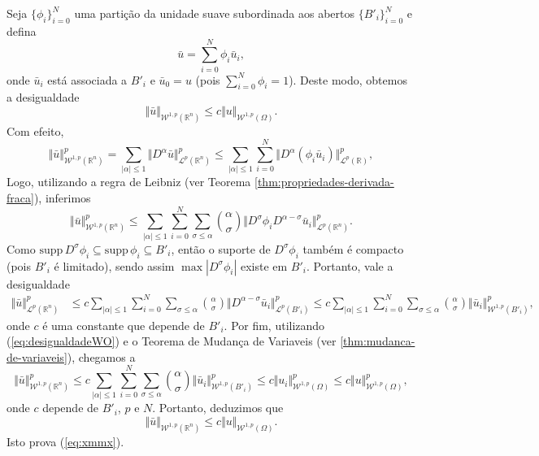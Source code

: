 \documentclass[a4paper, 11pt]{book}
\theoremstyle{definition}
\newcommand{\bR}{\mathbb{R}}
\newcommand{\cL}{\mathcal{L}}
\newcommand{\cW}{\mathcal{W}}
\newcommand{\supp}{\mathrm{supp}\,}
\begin{document}
\begin{prf}
    Seja $\{\phi_i\}_{i=0}^N$ uma partição da unidade suave subordinada aos abertos $\{B'_i\}_{i=0}^N$ e defina
    \begin{equation}
        \bar u = \sum_{i=0}^N \phi_i \bar u_i,
    \end{equation}
    onde $\bar u_i$ está associada a $B'_i$ e $\bar u_0 = u$ (pois $\sum_{i=0}^N \phi_i = 1$). Deste modo, obtemos a desigualdade
    \begin{equation} \label{eq:xmmx}
        \Vert \bar u \Vert_{\cW^{1,p}(\bR^n)} \leqslant c \Vert u \Vert_{\cW^{1,p}(\Omega)}.
    \end{equation}
    Com efeito,
    \[
        \Vert \bar u \Vert^p_{\cW^{1,p}(\bR^n)} = \sum_{|\alpha| \leqslant 1} \Vert D^\alpha \bar u \Vert^p_{\cL^p(\bR^n)}
        \leqslant \sum_{|\alpha| \leqslant 1} \sum_{i=0}^N \Vert D^\alpha (\phi_i \bar u_i) \Vert_{\cL^p(\bR)}^p,
    \]
    Logo, utilizando a regra de Leibniz (ver Teorema \ref{thm:propriedades-derivada-fraca}), inferimos
    \[
        \Vert \bar u \Vert_{\cW^{1,p}(\bR^n)}^p \leqslant \sum_{|\alpha| \leqslant 1} \sum_{i=0}^{N} \sum_{\sigma \leqslant \alpha} \binom{\alpha}{\sigma} \Vert D^\sigma \phi_i D^{\alpha - \sigma} \bar u_i \Vert_{\cL^p(\bR^n)}^p.
    \]
    Como $\supp D^\sigma \phi_i \subseteq \supp \phi_i \subseteq B'_i$, então o suporte de $D^\sigma \phi_i$ também é compacto (pois $B'_i$ é limitado), sendo assim $\max |D^\sigma \phi_i|$ existe em $B'_i$.
    Portanto, vale a desigualdade
    \[
        \begin{aligned}
            \Vert \bar u \Vert_{\cL^p(\bR^n)}^p &\leqslant c\sum_{|\alpha| \leqslant 1} \sum_{i=0}^{N} \sum_{\sigma \leqslant \alpha} \binom{\alpha}{\sigma} \Vert D^{\alpha - \sigma} \bar u_i \Vert_{\cL^p(B'_i)}^p \leqslant c\sum_{|\alpha| \leqslant 1} \sum_{i=0}^{N} \sum_{\sigma \leqslant \alpha} \binom{\alpha}{\sigma} \Vert \bar u_i \Vert_{\cW^{1,p}(B'_i)}^p,
        \end{aligned}
    \]
    onde $c$ é uma constante que depende de $B'_i$.
    Por fim, utilizando (\ref{eq:desigualdadeWO}) e o Teorema de Mudança de Variaveis (ver \ref{thm:mudanca-de-variaveis}), chegamos a
    \[
         \Vert \bar u \Vert^p_{\cW^{1,p}(\bR^n)} \leqslant c\sum_{|\alpha| \leqslant 1} \sum_{i=0}^{N} \sum_{\sigma \leqslant \alpha} \binom{\alpha}{\sigma} \Vert \bar u_i \Vert_{\cW^{1,p}(B'_i)}^p \leqslant c\Vert u_i \Vert_{\cW^{1,p}(\Omega)}^p \leqslant c \Vert u \Vert_{\cW^{1,p}(\Omega)}^p,
    \]
    onde $c$ depende de $B'_i$, $p$ e $N$.
    Portanto, deduzimos que
    \begin{equation} \label{eq:Mm}
        \Vert \bar u \Vert_{\cW^{1,p}(\bR^n)} \leqslant c \Vert u \Vert_{\cW^{1,p}(\Omega)}.
    \end{equation}
    Isto prova (\ref{eq:xmmx}).


\end{prf}
\end{document}
